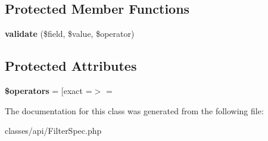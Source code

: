 \subsection*{Protected Member Functions}
\begin{DoxyCompactItemize}
\item 
\hypertarget{classDMA_1_1Friends_1_1Classes_1_1API_1_1FilterSpec_a408bac82f5c79775aff4ad03ec67205f}{}{\bfseries validate} (\$field, \$value, \$operator)\label{classDMA_1_1Friends_1_1Classes_1_1API_1_1FilterSpec_a408bac82f5c79775aff4ad03ec67205f}

\end{DoxyCompactItemize}
\subsection*{Protected Attributes}
\begin{DoxyCompactItemize}
\item 
\hypertarget{classDMA_1_1Friends_1_1Classes_1_1API_1_1FilterSpec_ab6b4cf35ef516989af72345f860d20de}{}{\bfseries \$operators} = \mbox{[}\textquotesingle{}exact\textquotesingle{} =$>$ \textquotesingle{}=\textquotesingle{}\label{classDMA_1_1Friends_1_1Classes_1_1API_1_1FilterSpec_ab6b4cf35ef516989af72345f860d20de}

\end{DoxyCompactItemize}


The documentation for this class was generated from the following file\+:\begin{DoxyCompactItemize}
\item 
classes/api/Filter\+Spec.\+php\end{DoxyCompactItemize}
